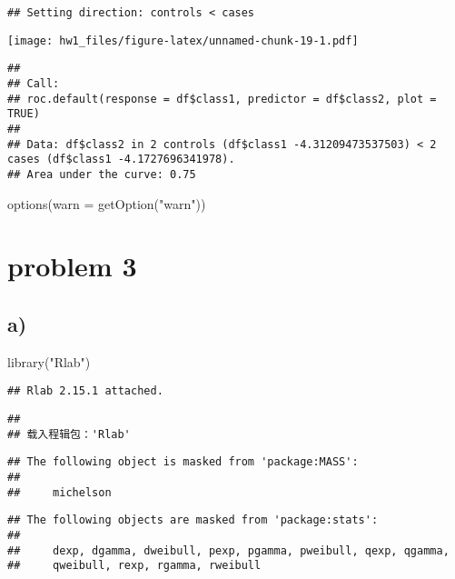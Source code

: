\documentclass[
]{article}
\newenvironment{Shaded}{\begin{snugshade}}{\end{snugshade}}
\newcommand{\AttributeTok}[1]{\textcolor[rgb]{0.77,0.63,0.00}{#1}}
\newcommand{\FunctionTok}[1]{\textcolor[rgb]{0.00,0.00,0.00}{#1}}
\newcommand{\NormalTok}[1]{#1}
\newcommand{\StringTok}[1]{\textcolor[rgb]{0.31,0.60,0.02}{#1}}
\begin{document}
\begin{verbatim}
## Setting direction: controls < cases
\end{verbatim}

\texttt{[image: hw1\_files/figure-latex/unnamed-chunk-19-1.pdf]}

\begin{verbatim}
## 
## Call:
## roc.default(response = df$class1, predictor = df$class2, plot = TRUE)
## 
## Data: df$class2 in 2 controls (df$class1 -4.31209473537503) < 2 cases (df$class1 -4.1727696341978).
## Area under the curve: 0.75
\end{verbatim}

\begin{Shaded}
\begin{Highlighting}[]
\FunctionTok{options}\NormalTok{(}\AttributeTok{warn =} \FunctionTok{getOption}\NormalTok{(}\StringTok{"warn"}\NormalTok{))}
\end{Highlighting}
\end{Shaded}

\hypertarget{problem-3}{%
\section{problem 3}\label{problem-3}}

\hypertarget{a-2}{%
\subsection{a)}\label{a-2}}

\begin{Shaded}
\begin{Highlighting}[]
\FunctionTok{library}\NormalTok{(}\StringTok{"Rlab"}\NormalTok{) }
\end{Highlighting}
\end{Shaded}

\begin{verbatim}
## Rlab 2.15.1 attached.
\end{verbatim}

\begin{verbatim}
## 
## 载入程辑包：'Rlab'
\end{verbatim}

\begin{verbatim}
## The following object is masked from 'package:MASS':
## 
##     michelson
\end{verbatim}

\begin{verbatim}
## The following objects are masked from 'package:stats':
## 
##     dexp, dgamma, dweibull, pexp, pgamma, pweibull, qexp, qgamma,
##     qweibull, rexp, rgamma, rweibull
\end{verbatim}
\end{document}
